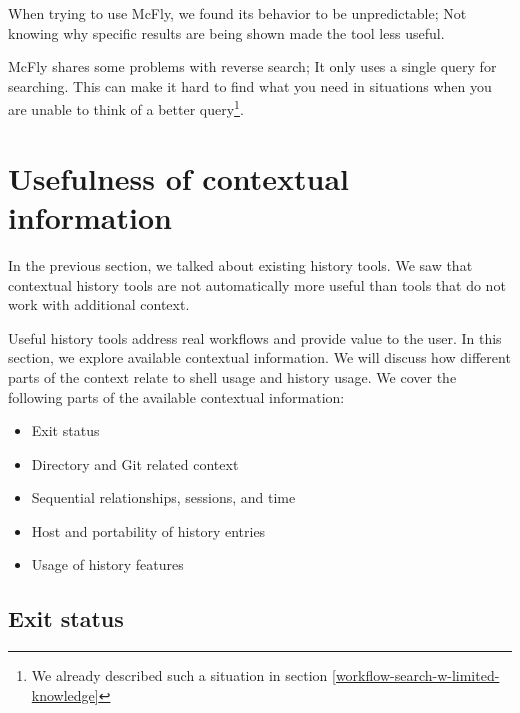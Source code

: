 When trying to use McFly, we found its behavior to be unpredictable; Not knowing why specific results are being shown made the tool less useful. 

McFly shares some problems with reverse search; It only uses a single query for searching. This can make it hard to find what you need in situations when you are unable to think of a better query\footnote{We already described such a situation in section \ref{workflow-search-w-limited-knowledge}}. 




\section{Usefulness of contextual information}

In the previous section, we talked about existing history tools. We saw that contextual history tools are not automatically more useful than tools that do not work with additional context. 

Useful history tools address real workflows and provide value to the user.
In this section, we explore available contextual information. We will discuss how different parts of the context relate to shell usage and history usage. %
We cover the following parts of the available contextual information:

\begin{itemize}
    \item Exit status
    \item Directory and Git related context
    \item Sequential relationships, sessions, and time
    \item Host and portability of history entries
    \item Usage of history features
\end{itemize}

\subsection{Exit status}

